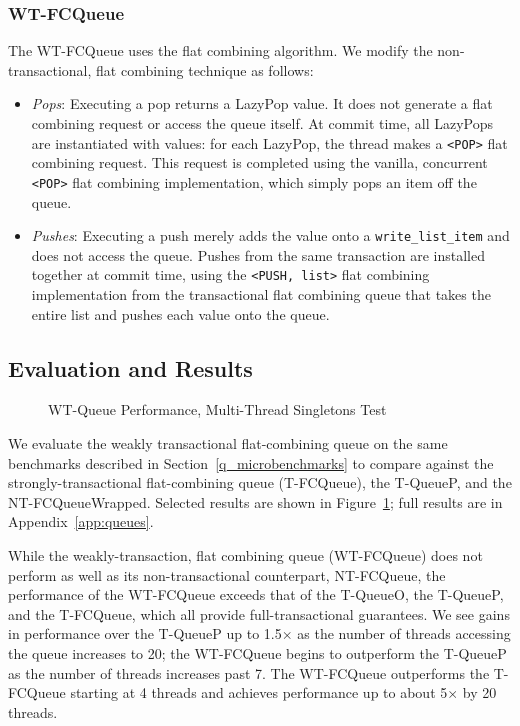 \subsubsection{WT-FCQueue}
The WT-FCQueue uses the flat combining algorithm. We modify the non-transactional, flat combining technique as follows:
\begin{itemize}
    \item \emph{Pops}: 
    Executing a pop returns a LazyPop value. It does not generate a flat combining request or access the queue itself. At commit time, all LazyPops are instantiated with values: for each LazyPop, the thread makes a \texttt{<POP>} flat combining request. This request is completed using the vanilla, concurrent \texttt{<POP>} flat combining implementation, which simply pops an item off the queue.

    \item \emph{Pushes}: 
    Executing a push merely adds the value onto a \texttt{write\_list\_item} and does not access the queue. Pushes from the same transaction are installed together at commit time, using the \texttt{<PUSH, list>} flat combining implementation from the transactional flat combining queue that takes the entire list and pushes each value onto the queue.
\end{itemize}

\subsection{Evaluation and Results}

\begin{figure}[H]
    \centering
    \caption{WT-Queue Performance, Multi-Thread Singletons Test}
    \label{fig:wtqs}
\end{figure}


We evaluate the weakly transactional flat-combining queue on the same benchmarks described in Section~\ref{q_microbenchmarks} to compare against the strongly-transactional flat-combining queue (T-FCQueue), the T-QueueP, and the NT-FCQueueWrapped. Selected results are shown in Figure~\ref{fig:wtqs}; full results are in Appendix~\ref{app:queues}. 

While the weakly-transaction, flat combining queue (WT-FCQueue) does not perform as well as its non-transactional counterpart, NT-FCQueue, the performance of the WT-FCQueue exceeds that of the T-QueueO, the T-QueueP, and the T-FCQueue, which all provide full-transactional guarantees. We see gains in performance over the T-QueueP up to 1.5$\times$ as the number of threads accessing the queue increases to 20; the WT-FCQueue begins to outperform the T-QueueP as the number of threads increases past 7. The WT-FCQueue outperforms the T-FCQueue starting at 4 threads and achieves performance up to about 5$\times$ by 20 threads.
 
